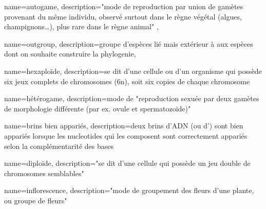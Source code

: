 






 {
    name={autogame},
    description={"mode de reproduction par union de gamètes provenant du même individu, observé surtout dans le règne végétal (algues, champignons…), plus rare dans le règne animal" \cite{Robert}},
}

 {
    name={outgroup},
    description={groupe d'espèces lié mais extérieur à aux espèces dont on souhaite construire la \gls{phylogenie}},
}

% 
 {
    name={hexaploïde},
    description={se dit d'une cellule ou d'un organisme qui possède six jeux complets de chromosomes (6n), soit six copies de chaque chromosome}
}
 
 {
    name={hétérogame},
    description={mode de "reproduction sexuée par deux gamètes de morphologie différente (par ex. ovule et spermatozoïde)" \cite{Robert}}
}

 {
    name={brins bien appariés},
    description={deux brins d'ADN (ou d'\ARN) sont bien appariés lorsque les \glspl{nucleotide} qui les composent sont correctement appariés selon la complémentarité des bases}
}

 {
    name=diploïde,
    description={"se dit d'une cellule qui possède un jeu double de chromosomes semblables" \cite{Robert}}
}

 {
    name=inflorescence,
    description={"mode de groupement des fleurs d'une plante, ou groupe de fleurs" \cite{LeDico}}
}

